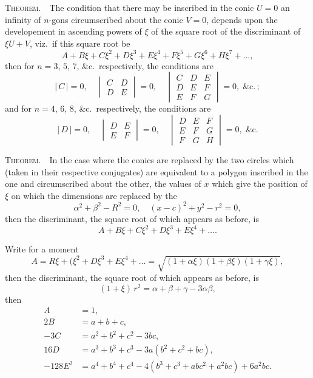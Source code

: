 \documentclass[11pt,a4paper]{article}
\theoremstyle{definition}
\begin{document}
\noindent\textsc{Theorem.}\ \ The condition that there may be inscribed in the conic $U=0$ an
infinity of $n$-gons circumscribed about the conic $V=0$, depends upon the developement
in ascending powers of $\xi$ of the square root of the discriminant of $\xi U + V$, viz.\ if
this square root be
\[
A + B\xi + C\xi^2 + D\xi^3 + E\xi^4 + F\xi^5 + G\xi^6 + H\xi^7 + \ldots ,
\]
then for $n = 3$, $5$, $7$, \&c.\ respectively, the conditions are
\[
\big|\,C\,\big|=0,\quad
\begin{vmatrix} C & D \\ D & E \end{vmatrix} = 0,\quad
\begin{vmatrix} C & D & E \\ D & E & F \\ E & F & G \end{vmatrix} = 0,\;\&\mathrm{c.\,;}
\]
and for $n = 4$, $6$, $8$, \&c.\ respectively, the conditions are
\[
\big|\,D\,\big|=0,\quad
\begin{vmatrix} D & E \\ E & F \end{vmatrix} = 0,\quad
\begin{vmatrix} D & E & F \\ E & F & G \\ F & G & H \end{vmatrix} = 0,\;\&\mathrm{c.}
\]

\medskip

\noindent\textsc{Theorem.}\ \ In the case where the conics are replaced by the two circles
which (taken in their respective conjugates) are equivalent to a polygon inscribed
in the one and circumscribed about the other, the values of $x$ which give the position
of $\xi$ on which the dimensions are replaced by the
\[
\alpha^2 + \beta^2 - R^2 = 0,\quad(x-c)^2 + y^2 - r^2 = 0,
\]
then the discriminant, the square root of which appears as before, is
\[
A + B\xi + C\xi^2 + D\xi^3 + E\xi^4 + \ldots .
\]

\medskip

Write for a moment
\[
A = R\xi + (\xi^2 + D\xi^3 + E\xi^4 + \ldots = \sqrt{(1+\alpha\xi)(1+\beta\xi)(1+\gamma\xi)},
\]
then the discriminant, the square root of which appears as before, is
\[
(1+\xi)\,r^2 = \alpha + \beta + \gamma - 3\alpha\beta,
\]
then
\begin{align*}
A &= 1, \\
2B &= a + b + c, \\
-3C &= a^2 + b^2 + c^2 - 3bc, \\
16D &= a^3 + b^3 + c^3 - 3a(b^2 + c^2 + bc), \\
-128E^2 &= a^4 + b^4 + c^4 - 4(b^3 + c^3 + abc^2 + a^2bc) + 6a^2bc.
\end{align*}
\end{document}

